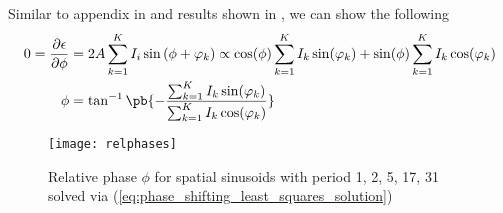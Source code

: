 \documentclass[../writeup.tex]{subfiles}
\begin{document}
Similar to appendix in \cite{morenoEmbeddedPhaseShifting2015} and results shown in \cite{pribanicEfficientMultiplePhase2010,morenoEmbeddedPhaseShifting2015}, we can show the following
\begin{align}
    0
        = \frac{\partial \epsilon}{\partial \phi}
        &= 2A \sum_{k=1}^K I_i\sin \left( \phi + \varphi_k \right)
        \propto \cos(\phi) \sum_{k=1}^K I_k \sin(\varphi_k) + \sin(\phi) \sum_{k=1}^{K} I_k \cos(\varphi_k) 
        \nonumber \\
    \phi
        &= \tan^{-1}\pb{
            -
            \frac{
                \sum_{k=1}^K I_k \sin(\varphi_k)
            }{
                \sum_{k=1}^K I_k \cos(\varphi_k)
            }
        }
        \label{eq:phase_shifting_least_squares_solution}
\end{align}
\begin{figure}[h!]
    \begin{center}
        \texttt{[image: relphases]}
    \end{center}
    \caption{Relative phase $\phi$ for spatial sinusoids with period 1, 2, 5, 17, 31 solved via (\ref{eq:phase_shifting_least_squares_solution})}
    \label{fig:relative_phase_solution}
\end{figure}
\end{document}
